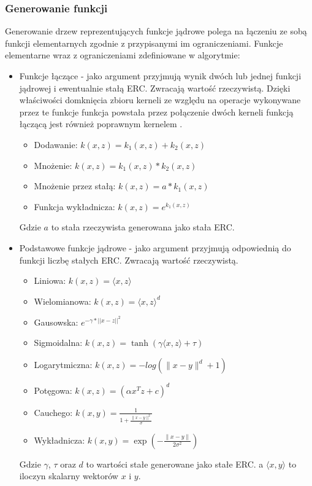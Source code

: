 \subsubsection{Generowanie funkcji}
Generowanie drzew reprezentujących funkcje jądrowe polega na łączeniu ze sobą funkcji elementarnych zgodnie z  przypisanymi im ograniczeniami.
Funkcje elementarne wraz z ograniczeniami zdefiniowane w algorytmie:
\begin{itemize}
\item Funkcje łączące - jako argument przyjmują wynik dwóch lub jednej funkcji jądrowej i ewentualnie stałą ERC. Zwracają wartość rzeczywistą. Dzięki właściwości domknięcia zbioru kerneli ze względu na operacje wykonywane przez te funkcje funkcja powstała przez połączenie dwóch kerneli funkcją łączącą jest również poprawnym kernelem \cite{Shawe-Taylor:2004:KMP:975545}.
	\begin{itemize}
	\item Dodawanie: $ k(x, z) = k_1(x,z) + k_2(x,z) $
	\item Mnożenie: $ k(x, z) = k_1(x,z) * k_2(x,z) $	
	\item Mnożenie przez stałą: $ k(x, z) = a * k_1(x,z) $
	\item Funkcja wykładnicza: $ k(x, z) = e ^{k_1(x,z)} $
	\end{itemize}
	Gdzie $ a $ to stała rzeczywista generowana jako stała ERC.
\item Podstawowe funkcje jądrowe - jako argument przyjmują odpowiednią do funkcji liczbę stałych ERC. Zwracają wartość rzeczywistą.
	\begin{itemize}
	\item Liniowa: $ k(x, z) = \langle x,z \rangle $	
	\item Wielomianowa: $ k(x, z) = \langle x,z \rangle ^d $
	\item Gausowska: $ e^{-\gamma*||x-z||^2} $	
	\item Sigmoidalna: $ k(x, z) = \tanh(\gamma \langle x,z \rangle + \tau) $
	\item Logarytmiczna: $ k(x, z) = - log (\lVert x-y \rVert ^d + 1) $
	\item Potęgowa: $ k(x, z) = (\alpha x^T z + c)^d $
	\item Cauchego: $ k(x, y) = \frac{1}{1 + \frac{\lVert x-y \rVert^2}{\sigma} } $ 
	\item Wykładnicza: $ k(x, y) = \exp\left(-\frac{ \lVert x-y \rVert }{2\sigma^2}\right) $
	\end{itemize}
	Gdzie $ \gamma $, $ \tau $ oraz $ d $ to wartości stałe generowane jako stałe ERC. a $ \langle x,y \rangle $ to iloczyn skalarny wektorów $x$ i $y$.

\end{itemize}
